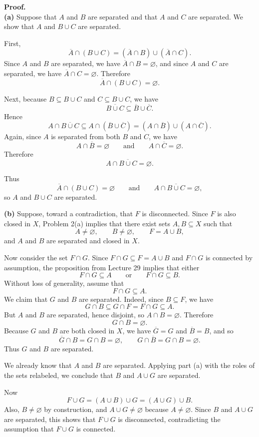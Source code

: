 \documentclass[12pt]{article}
\begin{document}
\textbf{Proof.}\\
\textbf{(a)} Suppose that $A$ and $B$ are separated and that $A$ and $C$ are separated. We show that $A$ and $B\cup C$ are separated.

First,
\[
\overline{A}\cap (B\cup C)
=(\overline{A}\cap B)\cup(\overline{A}\cap C).
\]
Since $A$ and $B$ are separated, we have $\overline{A}\cap B=\varnothing$, and since $A$ and $C$ are separated, we have $\overline{A}\cap C=\varnothing$. Therefore
\[
\overline{A}\cap (B\cup C)=\varnothing.
\]

Next, because $B\subseteq B\cup C$ and $C\subseteq B\cup C$, we have
\[
\overline{B\cup C}\subseteq \overline{B}\cup\overline{C}.
\]
Hence
\[
A\cap\overline{B\cup C}
\subseteq A\cap(\overline{B}\cup\overline{C})
=(A\cap\overline{B})\cup(A\cap\overline{C}).
\]
Again, since $A$ is separated from both $B$ and $C$, we have
\[
A\cap\overline{B}=\varnothing
\qquad\text{and}\qquad
A\cap\overline{C}=\varnothing.
\]
Therefore
\[
A\cap\overline{B\cup C}=\varnothing.
\]

Thus
\[
\overline{A}\cap(B\cup C)=\varnothing
\qquad\text{and}\qquad
A\cap\overline{B\cup C}=\varnothing,
\]
so $A$ and $B\cup C$ are separated.

\textbf{(b)} Suppose, toward a contradiction, that $F$ is disconnected. Since $F$ is also closed in $X$, Problem 2(a) implies that there exist sets $A,B\subseteq X$ such that
\[
A\neq\varnothing,
\qquad
B\neq\varnothing,
\qquad
F=A\cup B,
\]
and $A$ and $B$ are separated and closed in $X$.

Now consider the set $F\cap G$. Since $F\cap G\subseteq F=A\cup B$ and $F\cap G$ is connected by assumption, the proposition from Lecture 29 implies that either
\[
F\cap G\subseteq A
\qquad\text{or}\qquad
F\cap G\subseteq B.
\]
Without loss of generality, assume that
\[
F\cap G\subseteq A.
\]
We claim that $G$ and $B$ are separated. Indeed, since $B\subseteq F$, we have
\[
G\cap B \subseteq G\cap F = F\cap G \subseteq A.
\]
But $A$ and $B$ are separated, hence disjoint, so $A\cap B=\varnothing$. Therefore
\[
G\cap B=\varnothing.
\]
Because $G$ and $B$ are both closed in $X$, we have $\overline{G}=G$ and $\overline{B}=B$, and so
\[
\overline{G}\cap B = G\cap B = \varnothing,
\qquad
G\cap\overline{B} = G\cap B = \varnothing.
\]
Thus $G$ and $B$ are separated.

We already know that $A$ and $B$ are separated. Applying part (a) with the roles of the sets relabeled, we conclude that $B$ and $A\cup G$ are separated.

Now
\[
F\cup G = (A\cup B)\cup G = (A\cup G)\cup B.
\]
Also, $B\neq\varnothing$ by construction, and $A\cup G\neq\varnothing$ because $A\neq\varnothing$. Since $B$ and $A\cup G$ are separated, this shows that $F\cup G$ is disconnected, contradicting the assumption that $F\cup G$ is connected.
\end{document}

